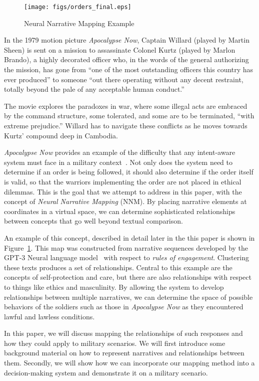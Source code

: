 \documentclass[11pt,dvipdfm]{article}
\begin{document}
\begin{figure}[!h]
\centering
\texttt{[image: figs/orders\_final.eps]}
\caption{\label{fig:example}Neural Narrative Mapping Example}
\end{figure}

In the 1979 motion picture \textit{Apocalypse Now}, Captain Willard (played by Martin Sheen) is sent on a mission to assassinate Colonel Kurtz (played by Marlon Brando), a highly decorated officer who, in the words of the general authorizing the mission, has gone from \enquote{one of the most outstanding officers this country has ever produced} to someone \enquote{out there operating without any decent restraint, totally beyond the pale of any acceptable human conduct.} 

The movie explores the paradoxes in war, where some illegal acts are embraced by the command structure, some tolerated, and some are to be terminated, \enquote{with extreme prejudice.} Willard has to navigate these conflicts as he moves towards Kurtz' compound deep in Cambodia.  

\textit{Apocalypse Now} provides an example of the difficulty that any intent-aware system must face in a military context~\cite{shattuck2000communication}. Not only does the system need to determine if an order is being followed, it should also determine if the order itself is valid, so that the warriors implementing the order are not placed in ethical dilemmas. This is the goal that we attempt to address in this paper, with the concept of \textit{Neural Narrative Mapping} (NNM). By placing narrative elements at coordinates in a virtual space, we can determine sophisticated relationships between concepts that go well beyond textual comparison.

An example of this concept, described in detail later in the this paper is shown in Figure~\ref{fig:example}. This map was constructed  from narrative sequences developed by the GPT-3 Neural language model~\cite{radford2018improving} with respect to \textit{rules of engagement}. Clustering these texts produces a set of relationships. Central to this example are the concepts of self-protection and care, but there are also relationships with respect to things like ethics and masculinity. By allowing the system to develop relationships between multiple narratives, we can determine the space of possible behaviors of the soldiers such as those in \textit{Apocalypse Now} as they encountered lawful and lawless conditions.

In this paper, we will discuss mapping the relationships of such responses and how they could apply to military scenarios.  We will first introduce some background material on how to represent narratives and relationships between them. Secondly, we will show how we can incorporate our mapping method into a decision-making system and demonstrate it on a military scenario.
\end{document}
